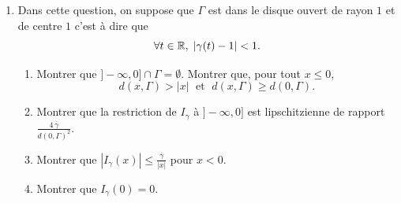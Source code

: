 \begin{enumerate}
\item \label{trajdisq}
 Dans cette question, on suppose que $\Gamma$ est dans le disque ouvert de rayon $
 1$ et de centre $1$ c'est à dire que 
\[
 \forall t \in \mathbb{R}, \; \left| \gamma(t) - 1 \right| < 1.
\]
\begin{enumerate}
 \item Montrer que $]-\infty , 0 ] \cap \Gamma = \emptyset$. Montrer que, pour tout $x \leq 0$,
\[
 d(x,\Gamma) > |x| \; \text{ et } \; d(x,\Gamma) \geq d(0,\Gamma).
\]

 \item Montrer que la restriction de $I_\gamma$ à $]-\infty, 0]$ est lipschitzienne de rapport $\frac{4 \, \overline{\gamma}}{d(0,\Gamma)^2}$.
 \item Montrer que $\left|I_\gamma(x)\right| \leq \frac{\overline{\gamma}}{|x|}$ pour $x<0$.
 \item Montrer que $I_\gamma(0) = 0$.
\end{enumerate}

\end{enumerate}

